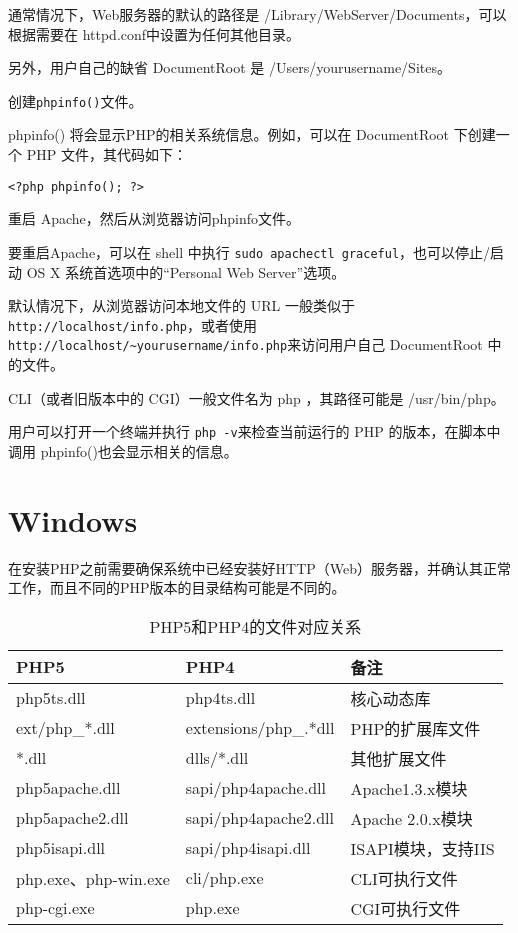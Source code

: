 \begin{compactenum}
通常情况下，Web服务器的默认的路径是 /Library/WebServer/Documents，可以根据需要在 httpd.conf中设置为任何其他目录。

另外，用户自己的缺省 DocumentRoot 是 /Users/yourusername/Sites。

\item 创建\texttt{phpinfo()}文件。

phpinfo() 将会显示PHP的相关系统信息。例如，可以在 DocumentRoot 下创建一个 PHP 文件，其代码如下：

\indent \indent \verb|<?php phpinfo(); ?>|

\item 重启 Apache，然后从浏览器访问phpinfo文件。

要重启Apache，可以在 shell 中执行 \texttt{sudo apachectl graceful}，也可以停止/启动 OS X 系统首选项中的“Personal Web Server”选项。

默认情况下，从浏览器访问本地文件的 URL 一般类似于\texttt{http://localhost/info.php}，或者使用\verb|http://localhost/~yourusername/info.php|来访问用户自己 DocumentRoot 中的文件。


\end{compactenum}

CLI（或者旧版本中的 CGI）一般文件名为 php ，其路径可能是 /usr/bin/php。

用户可以打开一个终端并执行 \texttt{php -v}来检查当前运行的 PHP 的版本，在脚本中调用 phpinfo()也会显示相关的信息。



\section{Windows}



在安装PHP之前需要确保系统中已经安装好HTTP（Web）服务器，并确认其正常工作，而且不同的PHP版本的目录结构可能是不同的。


\begin{table}[htbp]
\centering
\caption{PHP5和PHP4的文件对应关系}

\begin{tabular}{|l|l|l|}
\hline
PHP5 & PHP4 &备注\\
\hline
php5ts.dll & php4ts.dll & 核心动态库\\
\hline
ext/php\_*.dll & extensions/php\_.*dll & PHP的扩展库文件\\
\hline
*.dll & dlls/*.dll & 其他扩展文件\\
\hline
php5apache.dll & sapi/php4apache.dll & Apache1.3.x模块\\
\hline
php5apache2.dll & sapi/php4apache2.dll & Apache 2.0.x模块\\
\hline
php5isapi.dll & sapi/php4isapi.dll & ISAPI模块，支持IIS\\
\hline
php.exe、php-win.exe& cli/php.exe& CLI可执行文件\\
\hline
php-cgi.exe & php.exe & CGI可执行文件\\
\hline
\end{tabular}
\end{table}




